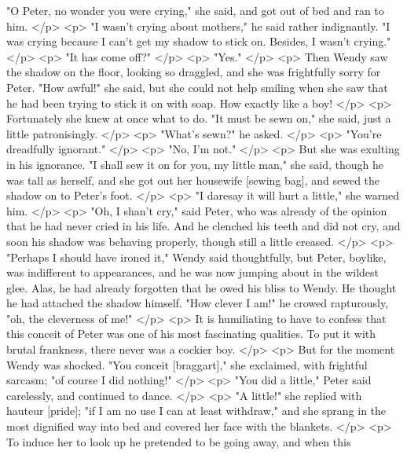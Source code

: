       "O Peter, no wonder you were crying," she said, and got out of bed and ran
      to him.
    </p>
    <p>
      "I wasn't crying about mothers," he said rather indignantly. "I was crying
      because I can't get my shadow to stick on. Besides, I wasn't crying."
    </p>
    <p>
      "It has come off?"
    </p>
    <p>
      "Yes."
    </p>
    <p>
      Then Wendy saw the shadow on the floor, looking so draggled, and she was
      frightfully sorry for Peter. "How awful!" she said, but she could not help
      smiling when she saw that he had been trying to stick it on with soap. How
      exactly like a boy!
    </p>
    <p>
      Fortunately she knew at once what to do. "It must be sewn on," she said,
      just a little patronisingly.
    </p>
    <p>
      "What's sewn?" he asked.
    </p>
    <p>
      "You're dreadfully ignorant."
    </p>
    <p>
      "No, I'm not."
    </p>
    <p>
      But she was exulting in his ignorance. "I shall sew it on for you, my
      little man," she said, though he was tall as herself, and she got out her
      housewife [sewing bag], and sewed the shadow on to Peter's foot.
    </p>
    <p>
      "I daresay it will hurt a little," she warned him.
    </p>
    <p>
      "Oh, I shan't cry," said Peter, who was already of the opinion that he had
      never cried in his life. And he clenched his teeth and did not cry, and
      soon his shadow was behaving properly, though still a little creased.
    </p>
    <p>
      "Perhaps I should have ironed it," Wendy said thoughtfully, but Peter,
      boylike, was indifferent to appearances, and he was now jumping about in
      the wildest glee. Alas, he had already forgotten that he owed his bliss to
      Wendy. He thought he had attached the shadow himself. "How clever I am!"
      he crowed rapturously, "oh, the cleverness of me!"
    </p>
    <p>
      It is humiliating to have to confess that this conceit of Peter was one of
      his most fascinating qualities. To put it with brutal frankness, there
      never was a cockier boy.
    </p>
    <p>
      But for the moment Wendy was shocked. "You conceit [braggart]," she
      exclaimed, with frightful sarcasm; "of course I did nothing!"
    </p>
    <p>
      "You did a little," Peter said carelessly, and continued to dance.
    </p>
    <p>
      "A little!" she replied with hauteur [pride]; "if I am no use I can at
      least withdraw," and she sprang in the most dignified way into bed and
      covered her face with the blankets.
    </p>
    <p>
      To induce her to look up he pretended to be going away, and when this

